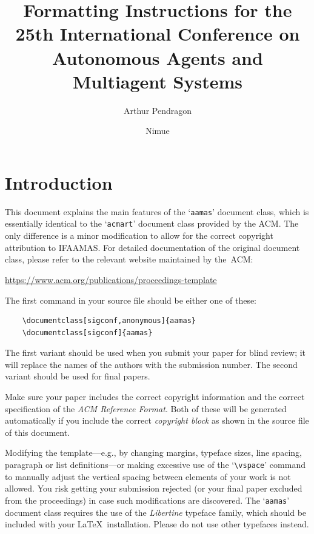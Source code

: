 \documentclass[sigconf,anonymous]{aamas}
\title[AAMAS-2026 Formatting Instructions]{Formatting Instructions for the 25th International Conference on Autonomous Agents and Multiagent Systems}
\author{Arthur Pendragon}
\affiliation{
  \institution{Camelot Castle}
  \city{Camelot}
  \country{United Kingdom}}
\author{Nimue}
\affiliation{
  \institution{The Lady's Lake}
  \city{Avalon}
  \country{United Kingdom}}
\begin{document}

\pagestyle{fancy}
\fancyhead{}


\maketitle 


\section{Introduction}

This document explains the main features of the `\texttt{aamas}' 
document class, which is essentially identical to the `\texttt{acmart}'
document class provided by the ACM. The only difference is a minor 
modification to allow for the correct copyright attribution to IFAAMAS.
For detailed documentation of the original document class, please refer
to the relevant website maintained by the~ACM:
%
\begin{center}
\url{https://www.acm.org/publications/proceedings-template}
\end{center}
%
The first command in your source file should be either one of these:
\begin{verbatim}
    \documentclass[sigconf,anonymous]{aamas}
    \documentclass[sigconf]{aamas}
\end{verbatim}
%
The first variant should be
used when you submit your paper for blind review; it will replace the names of the authors with the submission number.
The second variant should be used for final papers. 

Make sure your paper includes the correct copyright information and 
the correct specification of the \emph{ACM Reference Format}. Both of 
these will be generated automatically if you include the correct 
\emph{copyright block} as shown in the source file of this document.

Modifying the template---e.g., by changing margins, typeface sizes, 
line spacing, paragraph or list definitions---or making excessive use 
of the `\verb|\vspace|' command to manually adjust the vertical spacing 
between elements of your work is not allowed. You risk getting your 
submission rejected (or your final paper excluded from the proceedings) 
in case such modifications are discovered. The `\texttt{aamas}' document 
class requires the use of the \textit{Libertine} typeface family, which 
should be included with your \LaTeX\ installation. Please do not use 
other typefaces instead.
\end{document}
